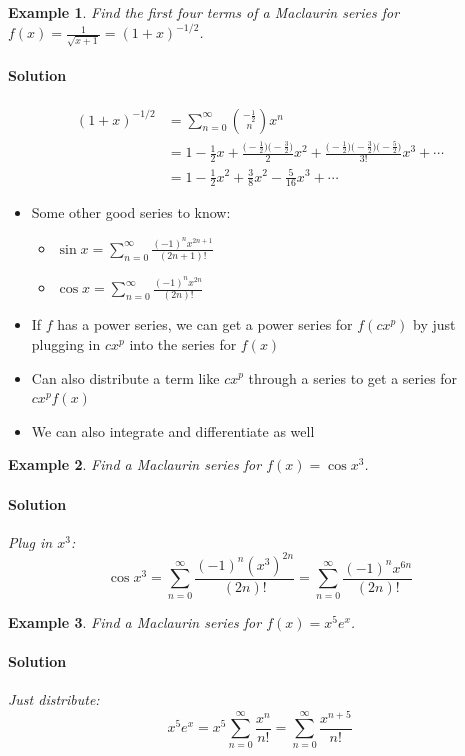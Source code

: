 \documentclass[letterpaper, 11pt, openany]{book}
\theoremstyle{mytheoremstyle}
\theoremstyle{myexamplestyle}
\newtheorem{example}{Example}[section]
\newenvironment{solution}{\paragraph{\sffamily \smaller \fontseries{b}\selectfont Solution}}{\hfill\faSquare}
\begin{document}
\begin{example}\label{e:binomseries}
    Find the first four terms of a Maclaurin series for $\displaystyle f(x) = \frac{1}{\sqrt{x + 1}} = (1 + x)^{-1/2}$.
    \begin{solution}
        \begin{align*}
            (1 + x)^{-1/2}  &= \sum_{n = 0}^{\infty} \binom{-\frac{1}{2}}{n} x^{n}\\
                            &= 1 - \frac{1}{2} x + \frac{\Big( -\frac{1}{2} \Big)\Big( -\frac{3}{2} \Big)}{2} x^{2} + \frac{\Big( -\frac{1}{2} \Big)\Big( -\frac{3}{2} \Big)\Big( -\frac{5}{2} \Big)}{3!} x^{3} + \cdots\\
                            &= 1 - \frac{1}{2} x^{2} + \frac{3}{8} x^{2} - \frac{5}{16} x^{3} + \cdots
        \end{align*}
    \end{solution}
\end{example}

\begin{itemize}
    \item Some other good series to know:
    \begin{itemize}
        \item $\displaystyle \sin x = \sum_{n = 0}^{\infty} \frac{(-1)^{n}x^{2n+1}}{(2n+1)!}$
        \item $\displaystyle \cos x = \sum_{n = 0}^{\infty} \frac{(-1)^{n}x^{2n}}{(2n)!}$
    \end{itemize}
    \item If $f$ has a power series, we can get a power series for $f(cx^{p})$ by just plugging in $cx^{p}$ into the series for $f(x)$ \faSmile
    \item Can also distribute a term like $cx^{p}$ through a series to get a series for $cx^{p} f(x)$
    \item We can also integrate and differentiate as well
\end{itemize}

\begin{example}\label{e:Macseriescos}
    Find a Maclaurin series for $f(x) = \cos x^{3}$.
    \begin{solution}
        Plug in $x^{3}$:
        \[\cos x^{3} = \sum_{n = 0}^{\infty} \frac{(-1)^{n}(x^{3})^{2n}}{(2n)!} = \sum_{n = 0}^{\infty} \frac{(-1)^{n}x^{6n}}{(2n)!}\]
    \end{solution}
\end{example}

\begin{example}\label{e:Macseriesexp}
    Find a Maclaurin series for $f(x) = x^{5} e^{x}$.
    \begin{solution}
        Just distribute:
        \[x^{5} e^{x} = x^{5} \sum_{n=0}^{\infty} \frac{x^{n}}{n!} = \sum_{n=0}^{\infty} \frac{x^{n+5}}{n!}\]
    \end{solution}
\end{example}
\end{document}

